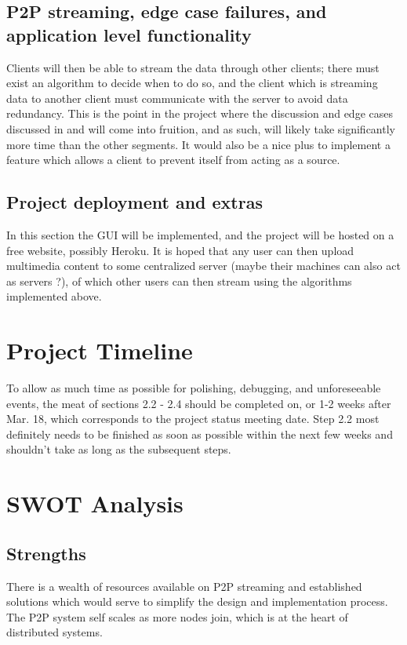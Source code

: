 \documentclass[fleqn,24pt]{SelfArx} %
\begin{document}
\subsection{P2P streaming, edge case failures, and application level functionality}
Clients will then be able to stream the data through other clients; there must exist an algorithm to decide when to do so, and the client which is streaming data to another client must communicate with the server to avoid data redundancy. This is the point in the project where the discussion and edge cases discussed in \cite{1} and \cite{2} will come into fruition, and as such, will likely take significantly more time than the other segments. It would also be a nice plus to implement a feature which allows a client to prevent itself from acting as a source.

\subsection{Project deployment and extras}
 In this section the GUI will be implemented, and the project will be hosted on a free website, possibly Heroku. It is hoped that any user can then upload multimedia content to some centralized server (maybe their machines can also act as servers ?), of which other users can then stream using the algorithms implemented above.

\section{Project Timeline}

To allow as much time as possible for polishing, debugging, and unforeseeable events, the meat of sections 2.2 - 2.4 should be completed on, or 1-2 weeks after Mar. 18, which corresponds to the project status meeting date. Step 2.2 most definitely needs to be finished as soon as possible within the next few weeks and shouldn't take as long as the subsequent steps.

\section{SWOT Analysis}

\subsection{Strengths}
There is a wealth of resources available on P2P streaming and established solutions which would serve to simplify the design and implementation process. The P2P system self scales as more nodes join, which is at the heart of distributed systems.
\end{document}
